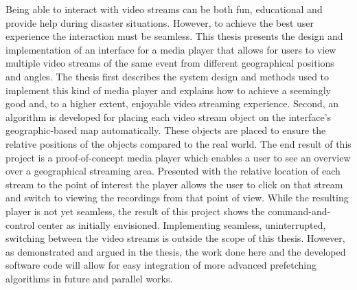 Being able to interact with video streams can be both fun, educational and provide help during disaster situations. However, to achieve the best user experience the interaction must be seamless. This thesis presents the design and implementation of an interface for a media player that allows for users to view multiple video streams of the same event from different geographical positions and angles. The thesis first describes the system design and methods used to implement this kind of media player and explains how to achieve a seemingly good and, to a higher extent, enjoyable video streaming experience. Second, an algorithm is developed for placing each video stream object on the interface's geographic-based map automatically. These objects are placed to ensure the relative positions of the objects compared to the real world. The end result of this project is a proof-of-concept media player which enables a user to see an overview over a geographical streaming area. Presented with the relative location of each stream to the point of interest the player allows the user to click on that stream and switch to viewing the recordings from that point of view. While the resulting player is not yet seamless, the result of this project shows the command-and-control center as initially envisioned. Implementing seamless, uninterrupted, switching between the video streams is outside the scope of this thesis. However, as demonstrated and argued in the thesis, the work done here and the developed software code will allow for easy integration of more advanced prefetching algorithms in future and parallel works.